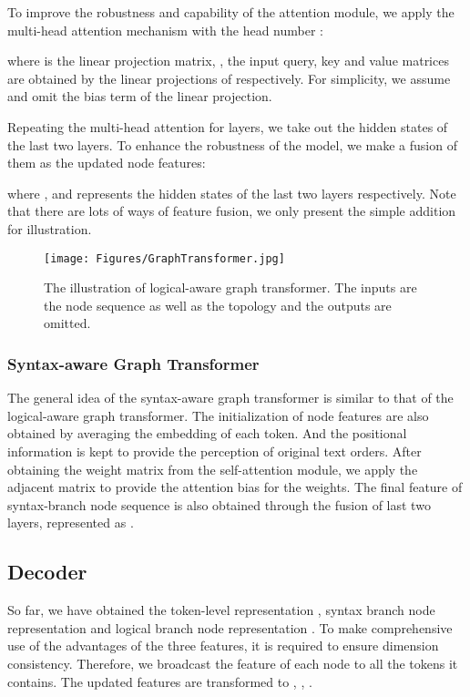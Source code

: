 \documentclass[sigconf]{acmart}
\begin{document}
To improve the robustness and capability of the attention module, we apply the multi-head attention mechanism with the head number :


where  is the linear projection matrix, , the input query, key and value matrices are obtained by the linear projections of  respectively. For simplicity, we assume  and omit the bias term of the linear projection.

Repeating the multi-head attention for  layers, we take out the hidden states of the last two layers. To enhance the robustness of the model, we make a fusion of them as the updated node features:


where , and  represents the hidden states of the last two layers respectively. Note that there are lots of ways of feature fusion, we only present the simple addition for illustration. 

\begin{figure}[t]
	\large
	\centering
	\texttt{[image: Figures/GraphTransformer.jpg]}
	\vspace{-0.2cm}
	\caption{The illustration of logical-aware graph transformer. The inputs are the node sequence as well as the topology and the outputs are omitted.}
	\label{transformer}
	\vspace{-0.3cm}
\end{figure}


\subsubsection{\textbf{Syntax-aware Graph Transformer}}
The general idea of the syntax-aware graph transformer is similar to that of the logical-aware graph transformer. The initialization of node features are also obtained by averaging the embedding of each token. And the positional information is kept to provide the perception of original text orders. After obtaining the weight matrix from the self-attention module, we apply the adjacent matrix  to provide the attention bias for the weights. The final feature of syntax-branch node sequence is also obtained through the fusion of last two layers, represented as .

\subsection{Decoder}
So far, we have obtained the token-level representation , syntax branch node representation  and logical branch node representation . To make comprehensive use of the advantages of the three features, it is required to ensure dimension consistency. Therefore, we broadcast the feature of each node to all the tokens it contains. The updated features are transformed to , , .
\end{document}
